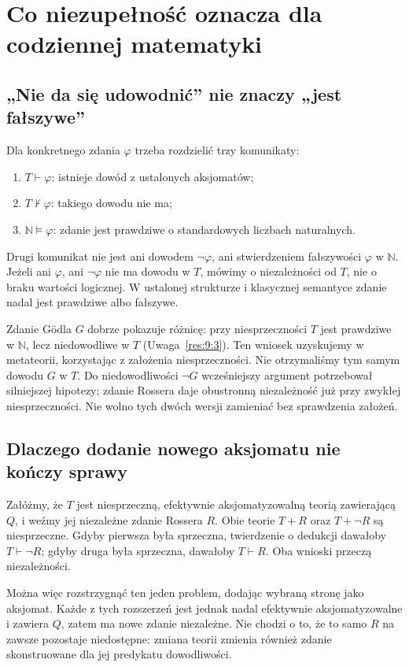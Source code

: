 \documentclass[11pt,a4paper]{article}
\numberwithin{equation}{section}
\theoremstyle{plain}
\theoremstyle{definition}
\theoremstyle{remark}
\begin{document}
\section{Co niezupełność oznacza dla codziennej matematyki}\label{sec:codzienna-matematyka}
\subsection*{„Nie da się udowodnić” nie znaczy „jest fałszywe”}\label{sec:16:1}
Dla konkretnego zdania $\varphi$ trzeba rozdzielić trzy komunikaty:
\begin{enumerate}[label=(\arabic*)]
\item $T\vdash\varphi$: istnieje dowód z ustalonych aksjomatów;
\item $T\nvdash\varphi$: takiego dowodu nie ma;
\item $\mathbb N\models\varphi$: zdanie jest prawdziwe o standardowych liczbach naturalnych.
\end{enumerate}
Drugi komunikat nie jest ani dowodem $\neg\varphi$, ani stwierdzeniem fałszywości $\varphi$ w $\mathbb N$. Jeżeli ani $\varphi$, ani $\neg\varphi$ nie ma dowodu w $T$, mówimy o niezależności od $T$, nie o braku wartości logicznej. W ustalonej strukturze i klasycznej semantyce zdanie nadal jest prawdziwe albo fałszywe.

Zdanie Gödla $G$ dobrze pokazuje różnicę: przy niesprzeczności $T$ jest prawdziwe w $\mathbb N$, lecz niedowodliwe w $T$ (Uwaga~\ref{res:9:3}). Ten wniosek uzyskujemy w metateorii, korzystając z założenia niesprzeczności. Nie otrzymaliśmy tym samym dowodu $G$ w $T$. Do niedowodliwości $\neg G$ wcześniejszy argument potrzebował silniejszej hipotezy; zdanie Rossera daje obustronną niezależność już przy zwykłej niesprzeczności. Nie wolno tych dwóch wersji zamieniać bez sprawdzenia założeń.

\subsection*{Dlaczego dodanie nowego aksjomatu nie kończy sprawy}\label{sec:16:2}
Załóżmy, że $T$ jest niesprzeczną, efektywnie aksjomatyzowalną teorią zawierającą $Q$, i weźmy jej niezależne zdanie Rossera $R$. Obie teorie $T+R$ oraz $T+\neg R$ są niesprzeczne. Gdyby pierwsza była sprzeczna, twierdzenie o dedukcji dawałoby $T\vdash\neg R$; gdyby druga była sprzeczna, dawałoby $T\vdash R$. Oba wnioski przeczą niezależności.

Można więc rozstrzygnąć ten jeden problem, dodając wybraną stronę jako aksjomat. Każde z tych rozszerzeń jest jednak nadal efektywnie aksjomatyzowalne i zawiera $Q$, zatem ma nowe zdanie niezależne. Nie chodzi o to, że to samo $R$ na zawsze pozostaje niedostępne: zmiana teorii zmienia również zdanie skonstruowane dla jej predykatu dowodliwości.
\end{document}
